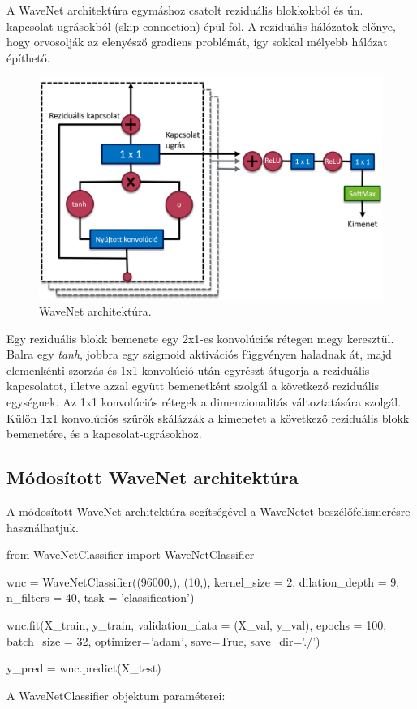 A WaveNet architektúra egymáshoz csatolt reziduális blokkokból és ún. kapcsolat-ugrásokból (skip-connection) épül föl. A reziduális hálózatok előnye, hogy orvosolják az elenyésző gradiens problémát, így sokkal mélyebb hálózat építhető.

\begin{figure}[!ht]
	\centering
	\includegraphics[width=150mm, keepaspectratio]{figures/wavenet_arch.png}
	\caption{WaveNet architektúra.}
	\label{fig:wavenet_arch}
\end{figure}

Egy reziduális blokk bemenete egy 2x1-es konvolúciós rétegen megy keresztül. Balra egy \emph{tanh}, jobbra egy szigmoid aktivációs függvényen haladnak át, majd elemenkénti szorzás és 1x1 konvolúció után egyrészt átugorja a reziduális kapcsolatot, illetve azzal együtt bemenetként szolgál a következő reziduális egységnek. Az 1x1 konvolúciós rétegek a dimenzionalitás változtatására szolgál. Külön 1x1 konvolúciós szűrők skálázzák a kimenetet a következő reziduális blokk bemenetére, és a kapcsolat-ugrásokhoz.

\subsection{Módosított WaveNet architektúra}

A módosított WaveNet architektúra segítségével a WaveNetet beszélőfelismerésre használhatjuk.
\bigskip
\begin{python}
	from WaveNetClassifier import WaveNetClassifier
	
	wnc = WaveNetClassifier((96000,), (10,), kernel_size = 2, dilation_depth = 9,
	                         n_filters = 40, task = 'classification')
	
	wnc.fit(X_train, y_train, validation_data = (X_val, y_val), epochs = 100,
	        batch_size = 32, optimizer='adam', save=True, save_dir='./')
	
	y_pred = wnc.predict(X_test)
	
\end{python}
\bigskip
A WaveNetClassifier objektum paraméterei:


